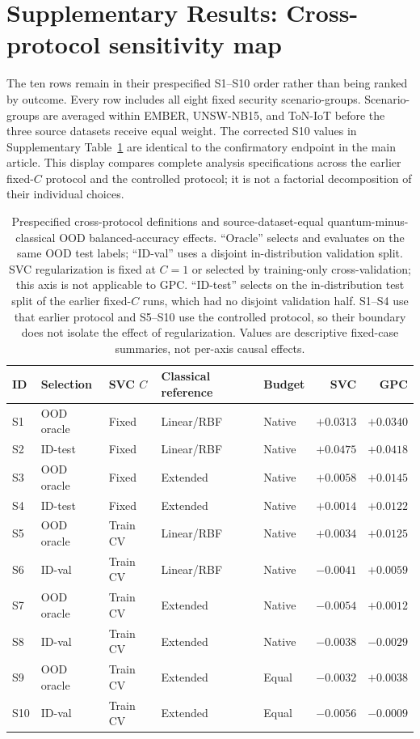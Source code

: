\documentclass[11pt]{article}
\begin{document}
\section*{Supplementary Results: Cross-protocol sensitivity map}
\label{supp:specification}

The ten rows remain in their prespecified S1--S10 order rather than being
ranked by outcome. Every row includes all eight fixed security
scenario-groups. Scenario-groups are averaged within EMBER, UNSW-NB15, and
ToN-IoT before the three source datasets receive equal weight. The corrected
S10 values in Supplementary Table~\ref{supp:tab_specification} are identical to the
confirmatory endpoint in the main article. This display compares complete
analysis specifications across the earlier fixed-$C$ protocol and the controlled protocol; it is not a factorial
decomposition of their individual choices.

\begin{table}[ht]
\centering
\caption{Prespecified cross-protocol definitions and source-dataset-equal
quantum-minus-classical OOD balanced-accuracy effects. ``Oracle'' selects and
evaluates on the same OOD test labels; ``ID-val'' uses a disjoint
in-distribution validation split. SVC regularization is fixed at $C=1$ or
selected by training-only cross-validation; this axis is not applicable to
GPC. ``ID-test'' selects on the in-distribution test split of the earlier fixed-$C$ runs, which had no disjoint validation half. S1--S4 use that earlier protocol and S5--S10 use the controlled protocol, so their boundary
does not isolate the effect of regularization. Values are descriptive
fixed-case summaries, not per-axis causal effects.}
\label{supp:tab_specification}
\scriptsize
\setlength{\tabcolsep}{3pt}
\begin{tabular}{lllllrr}
\toprule
ID & Selection & SVC $C$ & Classical reference & Budget & SVC & GPC \\
\midrule
S1  & OOD oracle & Fixed & Linear/RBF & Native & $+0.0313$ & $+0.0340$ \\
S2  & ID-test & Fixed & Linear/RBF & Native & $+0.0475$ & $+0.0418$ \\
S3  & OOD oracle & Fixed & Extended & Native & $+0.0058$ & $+0.0145$ \\
S4  & ID-test & Fixed & Extended & Native & $+0.0014$ & $+0.0122$ \\
S5  & OOD oracle & Train CV & Linear/RBF & Native & $+0.0034$ & $+0.0125$ \\
S6  & ID-val & Train CV & Linear/RBF & Native & $-0.0041$ & $+0.0059$ \\
S7  & OOD oracle & Train CV & Extended & Native & $-0.0054$ & $+0.0012$ \\
S8  & ID-val & Train CV & Extended & Native & $-0.0038$ & $-0.0029$ \\
S9  & OOD oracle & Train CV & Extended & Equal & $-0.0032$ & $+0.0038$ \\
S10 & ID-val & Train CV & Extended & Equal & $-0.0056$ & $-0.0009$ \\
\bottomrule
\end{tabular}
\end{table}
\end{document}
